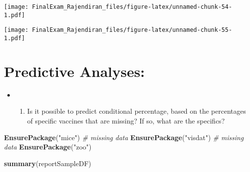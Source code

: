 \documentclass[]{article}
\newenvironment{Shaded}{\begin{snugshade}}{\end{snugshade}}
\newcommand{\CommentTok}[1]{\textcolor[rgb]{0.56,0.35,0.01}{\textit{#1}}}
\newcommand{\DataTypeTok}[1]{\textcolor[rgb]{0.13,0.29,0.53}{#1}}
\newcommand{\FloatTok}[1]{\textcolor[rgb]{0.00,0.00,0.81}{#1}}
\newcommand{\KeywordTok}[1]{\textcolor[rgb]{0.13,0.29,0.53}{\textbf{#1}}}
\newcommand{\NormalTok}[1]{#1}
\newcommand{\StringTok}[1]{\textcolor[rgb]{0.31,0.60,0.02}{#1}}
\providecommand{\tightlist}{%
  \setlength{\itemsep}{0pt}\setlength{\parskip}{0pt}}
\begin{document}
\texttt{[image: FinalExam\_Rajendiran\_files/figure-latex/unnamed-chunk-54-1.pdf]}

\begin{Shaded}
\end{Shaded}

\texttt{[image: FinalExam\_Rajendiran\_files/figure-latex/unnamed-chunk-55-1.pdf]}

\hypertarget{predictive-analyses-2}{%
\section{Predictive Analyses:}\label{predictive-analyses-2}}

\begin{itemize}
\item
  \begin{enumerate}
  \def\labelenumi{\arabic{enumi}.}
  \setcounter{enumi}{9}
  \tightlist
  \item
    Is it possible to predict conditional percentage, based on the
    percentages of specific vaccines that are missing? If so, what are
    the specifics?
  \end{enumerate}
\end{itemize}

\begin{Shaded}
\begin{Highlighting}[]
\KeywordTok{EnsurePackage}\NormalTok{(}\StringTok{"mice"}\NormalTok{) }\CommentTok{# missing data }
\KeywordTok{EnsurePackage}\NormalTok{(}\StringTok{"visdat"}\NormalTok{) }\CommentTok{# missing data }
\KeywordTok{EnsurePackage}\NormalTok{(}\StringTok{"zoo"}\NormalTok{)}

\KeywordTok{summary}\NormalTok{(reportSampleDF)}
\end{Highlighting}
\end{Shaded}
\end{document}
